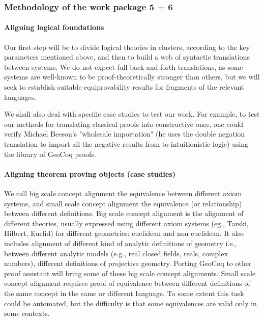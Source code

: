 \subsubsection{Methodology of the work package 5 + 6}

\paragraph{Aligning logical foundations}

Our first step will be to divide logical theories in clusters,
according to the key parameters mentioned above, and then to build a
web of syntactic translations between systems. We do not expect full
back-and-forth translations, as some systems are well-known to be
proof-theoretically stronger than others, but we will seek to
establish suitable equiprovability results for fragments of the
relevant languages.

We shall also deal with specific case studies to test our work.  For
example, to test our methods for translating classical proofs into
constructive ones, one could verify Michael Beeson's "wholesale
importation" (he uses the double negation translation to import all
the negative results from \cite{} to intuitionistic logic) using the
library of GeoCoq proofs.

\paragraph{Aligning theorem proving objects (case studies)}

We call big scale concept alignment the equivalence between different
axiom systems, and small scale concept alignment the equivalence (or
relationship) between different definitions.  Big scale concept
alignment is the alignment of different theories, usually expressed
using different axiom systems (eg., Tarski, Hilbert, Euclid) for
different geometries: euclidean and non euclidean. It also includes
alignment of different kind of analytic definitions of geometry i.e.,
between different analytic models (e.g., real closed fields, reals,
complex numbers), different definitions of projective
geometry. Porting GeoCoq to other proof assistant will bring some of
these big scale concept alignments.  Small scale concept alignment
requires proof of equivalence between different definitions of the
same concept in the same or different language.  To some extent this
task could be automated, but the difficulty is that some equivalences
are valid only in some contexts.

